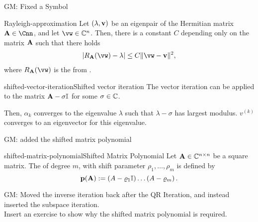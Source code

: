 \begin{todo}
  GM:
  Fixed a Symbol
\end{todo}
\begin{Lemma}{Rayleigh-approximation}
  Let $(\lambda,\mathbf v)$ be an eigenpair of the Hermitian matrix
  $\mata\in\Cnn$, and let $\vw\in\C^n$. Then, there is a constant $C$ depending only on the matrix $\mathbf A$ such that there holds
  \begin{gather}
    \abs{R_\mata(\vw)-\lambda} \le C \norm{\vw-\vv}^2,
  \end{gather}
  where $R_\mata(\vw)$ is the  from
  .
\end{Lemma}

\begin{Algorithm*}{shifted-vector-iteration}{Shifted vector iteration}
  The vector iteration can be applied to the matrix $\mathbf A-\sigma\mathbb I$
  for some $\sigma\in\mathbb C$.

  Then, $\alpha_k$ converges to the eigenvalue $\lambda$ such that
  $\lambda-\sigma$ has largest modulus. $v^{(k)}$ converges to an
  eigenvector for this eigenvalue.
\end{Algorithm*}

\begin{todo}
  GM: added the shifted matrix polynomial
\end{todo}
\begin{Definition}{shifted-matrix-polynomial}{Shifted Matrix Polynomial}
  Let \(\mathbf A \in \mathbb C^{n \times n}\) be a square matrix.
  The  of degree \(m\), with shift parameter \(\rho_1, \ldots, \rho_m\) is defined by
  \[ \mathbf{p(A)} := \left( A - \varrho_1 \mathbb I \right) \dots \left( A - \varrho_m\right).\]
\end{Definition}

\begin{todo}
  GM:
  Moved the inverse iteration back after the QR Iteration, and instead inserted the subspace iteration.\\
  Insert an exercise to show why the shifted matrix polynomial is required.
\end{todo}


